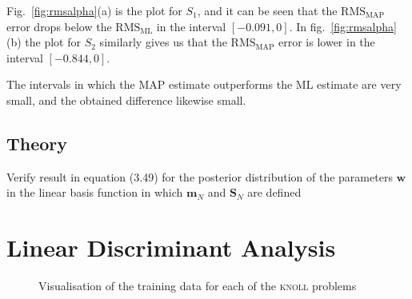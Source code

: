 \documentclass{article}
\newcommand{\vect}[1]{\ensuremath{\boldsymbol{\mathbf{#1}}}\xspace}
\begin{document}
Fig.~\ref{fig:rmsalpha}(a) is the plot for $S_1$, and it can be seen
that the $\mathrm{RMS}_\mathrm{MAP}$ error drops below the
$\mathrm{RMS}_\mathrm{ML}$ in the interval $[-0.091,0]$. In
fig.~\ref{fig:rmsalpha}(b) the plot for $S_2$ similarly gives us that
the $\mathrm{RMS}_\mathrm{MAP}$ error is lower in the interval
$[-0.844,0]$.

The intervals in which the MAP estimate outperforms the ML estimate
are very small, and the obtained difference likewise small.

\subsection{Theory}

Verify result in equation (3.49) for the posterior distribution of the
parameters \vect{w} in the linear basis function in which $\vect{m}_N$
and $\vect{S}_N$ are defined 

\newpage
\section{Linear Discriminant Analysis}
\begin{figure}
  \caption{Visualisation of the training data for each of the \textsc{knoll} problems}
  \label{fig:knolldata}
\end{figure}
\end{document}
